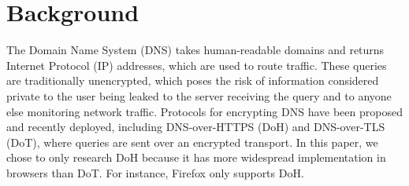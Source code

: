 \section{Background}\label{sec:back}

The Domain Name System (DNS) takes human-readable domains and returns Internet Protocol (IP) addresses, which are used to route traffic. 
These queries are traditionally unencrypted, which poses the risk of information considered private to the user being leaked to the server receiving the query and to anyone else monitoring network traffic.
Protocols for encrypting DNS have been proposed and recently deployed, including DNS-over-HTTPS (DoH) and DNS-over-TLS (DoT), where queries are sent over an encrypted transport.
In this paper, we chose to only research DoH because it has more widespread implementation in browsers than DoT.
For instance, Firefox only supports DoH. 